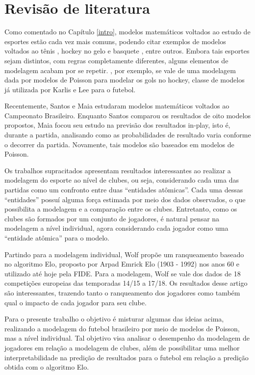 \chapter{Revisão de literatura}

Como comentado no Capítulo \ref{intro}, modelos matemáticos voltados ao estudo de esportes estão cada vez mais comuns, podendo citar exemplos de modelos voltados ao tênis \cite{bernardo}, hockey no gelo \cite{beaudoin} e basquete \cite{eric}, entre outros. Embora tais esportes sejam distintos, com regras completamente diferentes, alguns elementos de modelagem acabam por se repetir. \cite{beaudoin}, por exemplo, se vale de uma modelagem dada por modelos de Poisson para modelar os gols no hockey, classe de modelos já utilizada por Karlis \cite{karlis2000} \cite{karlis2003} e Lee \cite{lee} para o futebol.

Recentemente, Santos \cite{joao} e Maia \cite{luiz} estudaram modelos matemáticos voltados ao Campeonato Brasileiro. Enquanto Santos comparou os resultados de oito modelos propostos, Maia focou seu estudo na previsão dos resultados in-play, isto é, durante a partida, analisando como as probabilidades de resultado varia conforme o decorrer da partida. Novamente, tais modelos são baseados em modelos de Poisson. 

Os trabalhos supracitados apresentam resultados interessantes ao realizar a modelagem do esporte ao nível de clubes, ou seja, considerando cada uma das partidas como um confronto entre duas ``entidades atômicas''. Cada uma dessas ``entidades'' possuí alguma força estimada por meio dos dados observados, o que possibilita a modelagem e a comparação entre os clubes. Entretanto, como os clubes são formados por um conjunto de jogadores, é natural pensar na modelagem a nível individual, agora considerando cada jogador como uma ``entidade atômica'' para o modelo.

Partindo para a modelagem individual, Wolf \cite{wolf} propõe um ranqueamento baseado no algoritmo Elo, proposto por Arpad Emrick Elo (1903 - 1992) nos anos 60 e utilizado até hoje pela FIDE. Para a modelagem, Wolf se vale dos dados de 18 competições europeias das temporadas 14/15 a 17/18. Os resultados desse artigo são interessantes, trazendo tanto o ranqueamento dos jogadores como também qual o impacto de cada jogador para seu clube.

Para o presente trabalho o objetivo é misturar algumas das ideias acima, realizando a modelagem do futebol brasileiro por meio de modelos de Poisson, mas a nível individual. Tal objetivo visa analisar o desempenho da modelagem de jogadores em relação a modelagem de clubes, além de possibilitar uma melhor interpretabilidade na predição de resultados para o futebol em relação a predição obtida com o algoritmo Elo.

